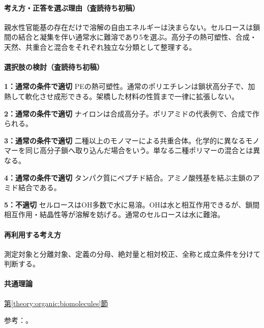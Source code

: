 \paragraph{考え方・正答を選ぶ理由（査読待ち初稿）} 親水性官能基の存在だけで溶解の自由エネルギーは決まらない。セルロースは鎖間の結合と凝集を伴い通常水に難溶であり5を選ぶ。高分子の熱可塑性、合成・天然、共重合と混合をそれぞれ独立な分類として整理する。

\paragraph{選択肢の検討（査読待ち初稿）}\mbox{}\par

\noindent\textbf{1：通常の条件で適切} PEの熱可塑性。通常のポリエチレンは鎖状高分子で、加熱して軟化させ成形できる。架橋した材料の性質まで一律に拡張しない。\par

\noindent\textbf{2：通常の条件で適切} ナイロンは合成高分子。ポリアミドの代表例で、合成で作られる。\par

\noindent\textbf{3：通常の条件で適切} 二種以上のモノマーによる共重合体。化学的に異なるモノマーを同じ高分子鎖へ取り込んだ場合をいう。単なる二種ポリマーの混合とは異なる。\par

\noindent\textbf{4：通常の条件で適切} タンパク質にペプチド結合。アミノ酸残基を結ぶ主鎖のアミド結合である。\par

\noindent\textbf{5：不適切} セルロースはOH多数で水に易溶。OHは水と相互作用できるが、鎖間相互作用・結晶性等が溶解を妨げる。通常のセルロースは水に難溶。\par

\paragraph{再利用する考え方} 測定対象と分離対象、定義の分母、絶対量と相対校正、全称と成立条件を分けて判断する。

\paragraph{共通理論} \hyperref[theory:organic:biomolecules]{第\ref*{theory:organic:biomolecules}節}

\par 参考：\cite{organic_physical,organic_step,analysis49_cellulose_ref}。

